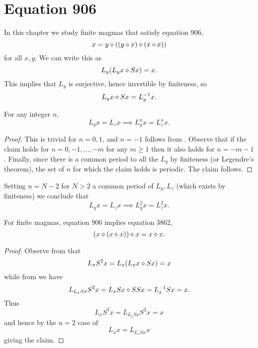 \chapter{Equation 906}\label{906-chapter}

In this chapter we study finite magmas that satisfy equation 906,
\begin{equation}\label{906}
  x = y \diamond ((y \diamond x) \diamond (x \diamond x))
\end{equation}
for all $x,y$.  We can write this as
\begin{equation}\label{906-a}
  L_y (L_y x \diamond Sx) = x.
\end{equation}
This implies that $L_y$ is surjective, hence invertible by finiteness, so
\begin{equation}\label{906-b}
   L_y x \diamond Sx = L_y^{-1} x.
\end{equation}

\begin{corollary}\label{edge-disjoint}  For any integer $n$,
$$ L_y x = L_z x \implies L_y^{n} x = L_z^{n} x.$$
\end{corollary}

\begin{proof}  This is trivial for $n=0,1$, and $n=-1$ follows from .  Observe that if the claim holds for $n=0,-1,\dots,-m$ for any $m \geq 1$ then it also holds for $n=-m-1$.  Finally, since there is a common period to all the $L_y$ by finiteness (or Legendre's theorem), the set of $n$ for which the claim holds is periodic.  The claim follows.
\end{proof}
Setting $n = N-2$ for $N>2$ a common period of $L_y,L_z$ (which exists by finiteness) we conclude that
\begin{equation}\label{lyzx}
  L_y x = L_z x \implies L_y^2 x = L_z^2 x.
\end{equation}

\begin{theorem}\label{906-3862}  \leanok For finite magmas, equation 906 implies
equation 3862,
\begin{equation}\label{3862}
    (x \diamond (x \diamond x)) \diamond x = x \diamond x.
\end{equation}
\end{theorem}

\begin{proof} \leanok Observe from  that
$$ L_x S^2 x = L_x (L_x x \diamond Sx) = x$$
while from  we have
$$ L_{L_x Sx} S^2 x = L_x Sx \diamond S S x = L_x^{-1} Sx = x.$$
Thus
$$ L_x S^2 x = L_{L_x Sx} S^2 x = x$$
and hence by the $n=2$ case of 
$$ L_x x = L_{L_x Sx} x$$
giving the claim.
\end{proof}
